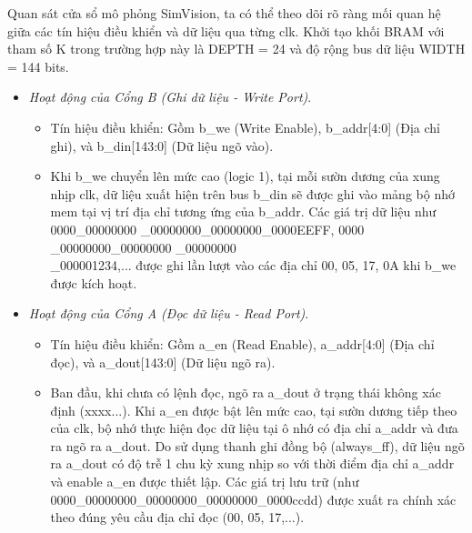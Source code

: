 \documentclass[12pt,a4paper,oneside]{book}
\begin{document}
Quan sát cửa sổ mô phỏng SimVision, ta có thể theo dõi rõ ràng mối quan hệ giữa các tín hiệu điều khiển và dữ liệu qua từng clk. Khởi tạo khối BRAM với tham số K trong trường hợp này là DEPTH = 24 và độ rộng bus dữ liệu WIDTH = 144 bits.
\begin{itemize}
    \item \textit{Hoạt động của Cổng B (Ghi dữ liệu - Write Port)}. 
    \begin{itemize}
        \item Tín hiệu điều khiển: Gồm b\_we (Write Enable), b\_addr[4:0] (Địa chỉ ghi), và b\_din[143:0] (Dữ liệu ngõ vào).
        \item Khi b\_we chuyển lên mức cao (logic 1), tại mỗi sườn dương của xung nhịp clk, dữ liệu xuất hiện trên bus b\_din sẽ được ghi vào mảng bộ nhớ mem tại vị trí địa chỉ tương ứng của b\_addr. Các giá trị dữ liệu như 0000\_00000000 \_00000000\_00000000\_0000EEFF, 0000
        \_00000000\_00000000 \_00000000\\ \_000001234,... được ghi lần lượt vào các địa chỉ 00, 05, 17, 0A khi b\_we được kích hoạt. 
    \end{itemize}
    \item \textit{Hoạt động của Cổng A (Đọc dữ liệu - Read Port)}.
    \begin{itemize}
        \item Tín hiệu điều khiển: Gồm a\_en (Read Enable), a\_addr[4:0] (Địa chỉ đọc), và a\_dout[143:0] (Dữ liệu ngõ ra).
        \item Ban đầu, khi chưa có lệnh đọc, ngõ ra a\_dout ở trạng thái không xác định (xxxx...). Khi a\_en được bật lên mức cao, tại sườn dương tiếp theo của clk, bộ nhớ thực hiện đọc dữ liệu tại ô nhớ có địa chỉ a\_addr và đưa ra ngõ ra a\_dout. Do sử dụng thanh ghi đồng bộ (always\_ff), dữ liệu ngõ ra a\_dout có độ trễ 1 chu kỳ xung nhịp so với thời điểm địa chỉ a\_addr và enable a\_en được thiết lập. Các giá trị lưu trữ (như 0000\_00000000\_00000000\_00000000\_0000ccdd) được xuất ra chính xác theo đúng yêu cầu địa chỉ đọc (00, 05, 17,...).
    \end{itemize}
     
\end{itemize}
\end{document}
